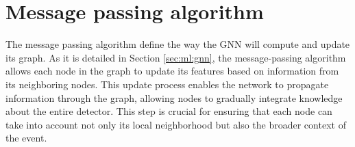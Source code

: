 \documentclass[../main.tex]{subfiles}
\begin{document}
\section{Message passing algorithm}
\label{sec:jgnn:mpa}
The message passing algorithm define the way the GNN will compute and update its graph. As it is detailed in Section \ref{sec:ml:gnn}, the message-passing algorithm allows each node in the graph to update its features based on information from its neighboring nodes. This update process enables the network to propagate information through the graph, allowing nodes to gradually integrate knowledge about the entire detector. This step is crucial for ensuring that each node can take into account not only its local neighborhood but also the broader context of the event.
\end{document}

